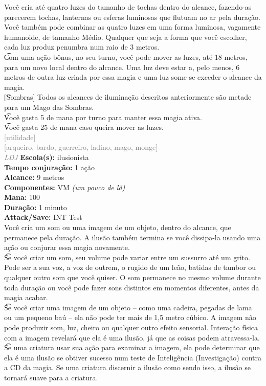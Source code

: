 \documentclass{RPG_Adventure}[2021/10/20]
\begin{document}
{\normalsize Você cria até quatro luzes do tamanho de tochas dentro do alcance, fazendo-as parecerem tochas, lanternas ou esferas luminosas que flutuam no ar pela duração. Você também pode combinar as quatro luzes em uma forma luminosa, vagamente humanoide, de tamanho Médio. Qualquer que seja a forma que você escolher, cada luz produz penumbra num raio de 3 metros.\\\t Com uma ação bônus, no seu turno, você pode mover as luzes, até 18 metros, para um novo local dentro do alcance. Uma luz deve estar a, pelo menos, 6 metros de outra luz criada por essa magia e uma luz some se exceder o alcance da magia.\\\t [Sombras] Todos os alcances de iluminação descritos anteriormente são metade para um Mago das Sombras.\\\t Você gasta 5 de mana por turno para manter essa magia ativa.\\\t Você gasta 25 de mana caso queira mover as luzes.\\}
{\scriptsize \textcolor{gray}{[utilidade]\\}}
{\scriptsize \textcolor{gray}{[arqueiro, bardo, guerreiro, ladino, mago, monge]\\}}
{\tiny \textcolor{gray}{\textit{LDJ}}}\jump{}
{\small \t \textbf{Escola(s):} ilusionista\\\t \textbf{Tempo conjuração:} 1 ação\\\t \textbf{Alcance:} 9 metros\\\t \textbf{Componentes:} VM \textit{(um pouco de lã)}\\\t \textbf{Mana:} 100\\\t \textbf{Duração:} 1 minuto\\\t \textbf{Attack/Save:} INT Test\\}
{\normalsize Você cria um som ou uma imagem de um objeto, dentro do alcance, que permanece pela duração. A ilusão também termina se você dissipa-la usando uma ação ou conjurar essa magia novamente.\\\t Se você criar um som, seu volume pode variar entre um sussurro até um grito. Pode ser a sua voz, a voz de outrem, o rugido de um leão, batidas de tambor ou qualquer outro som que você quiser. O som permanece no mesmo volume durante toda duração ou você pode fazer sons distintos em momentos diferentes, antes da magia acabar.\\\t Se você criar uma imagem de um objeto – como uma cadeira, pegadas de lama ou um pequeno baú – ela não pode ter mais de 1,5 metro cúbico. A imagem não pode produzir som, luz, cheiro ou qualquer outro efeito sensorial. Interação física com a imagem revelará que ela é uma ilusão, já que as coisas podem atravessa-la.\\\t Se uma criatura usar sua ação para examinar a imagem, ela pode determinar que ela é uma ilusão se obtiver sucesso num teste de Inteligência (Investigação) contra a CD da magia. Se uma criatura discernir a ilusão como sendo isso, a ilusão se tornará suave para a criatura.\\}
\end{document}
